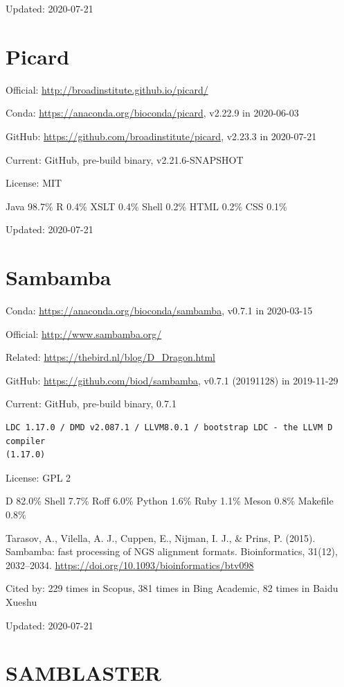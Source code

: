 \documentclass[]{article}
\newcommand{\cb}[3]{\par Cited by: {\color{blue}\Huge #1} times in Scopus, {\color{blue}\Huge #2} times in Bing Academic, {\color{blue}\Huge #3} times in Baidu Xueshu}
\begin{document}
Updated: 2020-07-21

\section{Picard}

Official: \url{http://broadinstitute.github.io/picard/}

Conda: \url{https://anaconda.org/bioconda/picard}, v2.22.9 in 2020-06-03

GitHub: \url{https://github.com/broadinstitute/picard}, v2.23.3 in 2020-07-21

Current: GitHub, pre-build binary, v2.21.6-SNAPSHOT

License: MIT

Java 98.7\% R 0.4\% XSLT 0.4\% Shell 0.2\% HTML 0.2\% CSS 0.1\% 

Updated: 2020-07-21

\section{Sambamba}

Conda: \url{https://anaconda.org/bioconda/sambamba}, v0.7.1 in 2020-03-15 

Official: \url{http://www.sambamba.org/}

Related: \url{https://thebird.nl/blog/D_Dragon.html}

GitHub: \url{https://github.com/biod/sambamba}, v0.7.1 (20191128) in 2019-11-29

Current: GitHub, pre-build binary, 0.7.1

\begin{verbatim}
LDC 1.17.0 / DMD v2.087.1 / LLVM8.0.1 / bootstrap LDC - the LLVM D compiler
(1.17.0)
\end{verbatim}

License: GPL 2

D 82.0\% Shell 7.7\% Roff 6.0\% Python 1.6\% Ruby 1.1\% Meson 0.8\% Makefile 0.8\%

Tarasov, A., Vilella, A. J., Cuppen, E., Nijman, I. J., \& Prins, P. (2015). Sambamba: fast processing of NGS alignment formats. Bioinformatics, 31(12), 2032–2034. \url{https://doi.org/10.1093/bioinformatics/btv098}\cb{229}{381}{82}

Updated: 2020-07-21

\section{SAMBLASTER}
\end{document}
